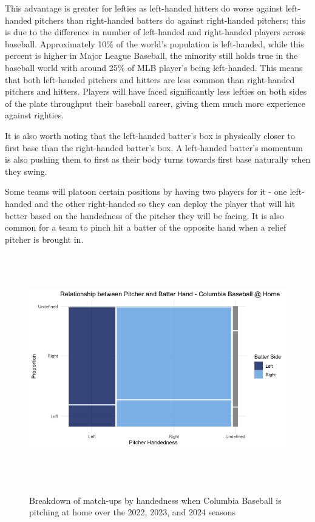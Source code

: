 \documentclass{article}
\begin{document}
This advantage is greater for lefties as left-handed hitters do worse against left-handed pitchers than right-handed batters do against right-handed pitchers; this is due to the difference in number of left-handed and right-handed players across baseball. Approximately 10\% of the world's population is left-handed, while this percent is higher in Major League Baseball, the minority still holds true in the baseball world with around 25\% of MLB player's being left-handed. This means that both left-handed pitchers and hitters are less common than right-handed pitchers and hitters. Players will have faced significantly less lefties on both sides of the plate throughput their baseball career, giving them much more experience against righties. \cite{mlb2023left-handedpitching} \cite{appliedvision2023}

It is also worth noting that the left-handed batter's box is physically closer to first base than the right-handed batter's box. A left-handed batter's momentum is also pushing them to first as their body turns towards first base naturally when they swing.

Some teams will platoon certain positions by having two players for it - one left-handed and the other right-handed so they can deploy the player that will hit better based on the handedness of the pitcher they will be facing. It is also common for a team to pinch hit a batter of the opposite hand when a relief pitcher is brought in. 

\vspace{1.5cm}
\begin{figure}[h]
    \centering        
    \includegraphics[height=10cm]{images/columbia_handedness.png}
    \caption{Breakdown of match-ups by handedness when Columbia Baseball is pitching at home over the 2022, 2023, and 2024 seasons}
    \cite{columbialions2022baseball}\cite{columbialions2023baseball}\cite{columbialions2024baseball}
\end{figure}
\vspace{1.5cm}
\end{document}
